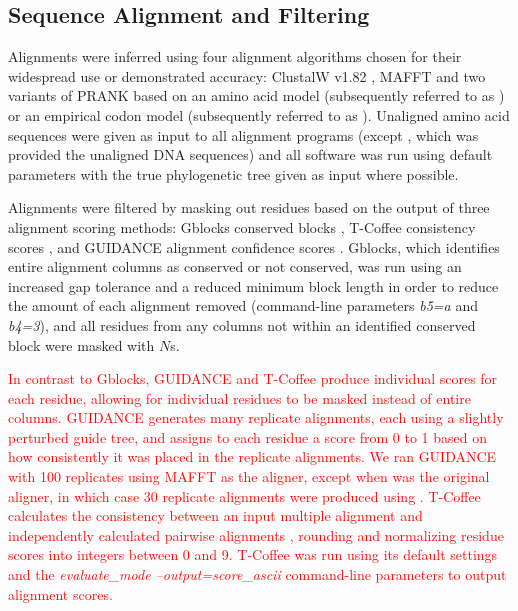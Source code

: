 \documentclass{article}
\begin{document}
\subsection*{Sequence Alignment and Filtering}

Alignments were inferred using four alignment algorithms chosen for
their widespread use or demonstrated accuracy: ClustalW v1.82
\citep{Thompson1994ClustalW}, MAFFT \citep{Katoh2005MAFFT} and two
variants of PRANK \citep{Loytynoja2005From} based on an amino acid
model (subsequently referred to as \pranka{}) or an empirical codon
model (subsequently referred to as \prankc{}). Unaligned amino acid
sequences were given as input to all alignment programs (except
\prankc{}, which was provided the unaligned DNA sequences) and all
software was run using default parameters with the true phylogenetic
tree given as input where possible.

Alignments were filtered by masking out residues based on the output
of three alignment scoring methods: Gblocks conserved blocks
\citep{Castresana2000Selection}, T-Coffee consistency scores
\citep{Notredame2000TCoffee,Notredame2003Using}, and GUIDANCE
alignment confidence scores \citep{Penn2010Alignment}. Gblocks, which
identifies entire alignment columns as conserved or not conserved, was
run using an increased gap tolerance and a reduced minimum block
length in order to reduce the amount of each alignment removed
(command-line parameters {\em b5=a} and {\em b4=3}), and all residues
from any columns not within an identified conserved block were masked
with $N$s.

\textcolor{red}{In contrast to Gblocks, GUIDANCE and T-Coffee produce
  individual scores for each residue,} \textcolor{red}{ allowing for
  individual residues to be masked instead of entire columns. GUIDANCE
  generates many replicate alignments, each using a slightly perturbed
  guide tree, and assigns to each residue a score from 0 to 1 based on
  how consistently it was placed in the replicate alignments. We ran
  GUIDANCE with 100 replicates using MAFFT as the aligner, except when
  \prankc was the original aligner, in which case 30 replicate
  alignments were produced using \pranka. T-Coffee calculates the
  consistency between an input multiple alignment and independently
  calculated pairwise alignments \citep{Notredame2003Using}, rounding
  and normalizing residue scores into integers between 0 and
  9. T-Coffee was run using its default settings and the {\em
    evaluate\_mode --output=score\_ascii} command-line parameters to
  output alignment scores.}
\end{document}
